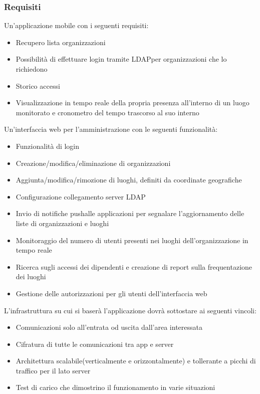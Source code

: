 \subsubsection{Requisiti}
Un'applicazione mobile con i seguenti requisiti:
\begin{itemize}
	\item Recupero lista organizzazioni
	\item Possibilità di effettuare login tramite LDAP\glo per organizzazioni che lo richiedono
	\item Storico accessi
	\item Visualizzazione in tempo reale della propria presenza all'interno di un luogo monitorato e cronometro del tempo trascorso al suo interno
\end{itemize}
Un'interfaccia web per l'amministrazione con le seguenti funzionalità:
\begin{itemize}
	\item Funzionalità di login
	\item Creazione/modifica/eliminazione di organizzazioni
	\item Aggiunta/modifica/rimozione di luoghi, definiti da coordinate geografiche
	\item Configurazione collegamento server LDAP\glo
	\item Invio di notifiche push\glosp alle applicazioni per segnalare l'aggiornamento delle liste di organizzazioni e luoghi
	\item Monitoraggio del numero di utenti presenti nei luoghi dell'organizzazione in tempo reale
	\item Ricerca sugli accessi dei dipendenti e creazione di report sulla frequentazione dei luoghi
	\item Gestione delle autorizzazioni per gli utenti dell'interfaccia web
\end{itemize}
L'infrastruttura su cui si baserà l'applicazione dovrà sottostare ai seguenti vincoli:
\begin{itemize}
	\item Comunicazioni solo all'entrata od uscita dall'area interessata
	\item Cifratura di tutte le comunicazioni tra app e server
	\item Architettura scalabile\glosp (verticalmente e orizzontalmente) e tollerante a picchi di traffico per il lato server
	\item Test di carico che dimostrino il funzionamento in varie situazioni
\end{itemize}

